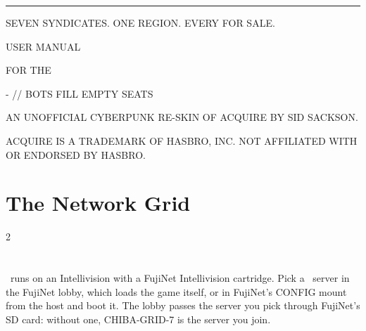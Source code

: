 \documentclass[12pt,letterpaper]{article}
\begin{document}
\begin{titlepage}
\machine
\vspace*{1.6in}
{\color{amber}\rule{\linewidth}{2pt}}\par\vspace{14pt}
{\fontsize{44}{48}\selectfont \game\par}\vspace{10pt}
{\fontsize{12}{16}\selectfont\color{steel} SEVEN SYNDICATES. ONE REGION. EVERY \MakeUppercase{} FOR SALE.\par}
\vspace{14pt}{\color{amber}\rule{\linewidth}{2pt}}\par
\vspace{0.35in}
{\fontsize{24}{30}\selectfont USER MANUAL\par}\vspace{4pt}
{\fontsize{14}{18}\selectfont\color{amber} FOR THE \MakeUppercase{\PlatformLong}\par}
\vspace{0.4in}
{\fontsize{12}{16}\selectfont \PlatformMachines\par
{}- \MakeUppercase{} \quad // \quad BOTS FILL EMPTY SEATS\par}
\vfill
{\fontsize{8.5}{11}\selectfont\color{steel}
AN UNOFFICIAL CYBERPUNK RE-SKIN OF ACQUIRE BY SID SACKSON.\par
ACQUIRE IS A TRADEMARK OF HASBRO, INC. NOT AFFILIATED WITH OR ENDORSED BY HASBRO.\par}
\end{titlepage}

\renewcommand{\secstatus}{THE SETTING \quad // \quad THE OBJECT \quad // \quad THE END}
\chapter{The Network Grid}
\begin{multicols}{2}
\end{multicols}

\renewcommand{\secstatus}{REGION \quad // \quad STATUS \quad // \quad HANDLE}
\chapter{}
\game\ runs on an Intellivision with a FujiNet Intellivision cartridge. Pick a \game\ server in the FujiNet lobby,
which loads the game itself, or in FujiNet's CONFIG mount  from the host
 and boot it. The lobby passes the server you pick through FujiNet's SD card: without
one, CHIBA-GRID-7 is the server you join.
\end{document}
